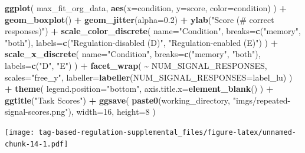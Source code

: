 \documentclass[
]{book}
\newenvironment{Shaded}{\begin{snugshade}}{\end{snugshade}}
\newcommand{\DataTypeTok}[1]{\textcolor[rgb]{0.13,0.29,0.53}{#1}}
\newcommand{\DecValTok}[1]{\textcolor[rgb]{0.00,0.00,0.81}{#1}}
\newcommand{\FloatTok}[1]{\textcolor[rgb]{0.00,0.00,0.81}{#1}}
\newcommand{\KeywordTok}[1]{\textcolor[rgb]{0.13,0.29,0.53}{\textbf{#1}}}
\newcommand{\NormalTok}[1]{#1}
\newcommand{\OperatorTok}[1]{\textcolor[rgb]{0.81,0.36,0.00}{\textbf{#1}}}
\newcommand{\StringTok}[1]{\textcolor[rgb]{0.31,0.60,0.02}{#1}}
\begin{document}
\begin{Shaded}
\begin{Highlighting}[]
\KeywordTok{ggplot}\NormalTok{( max\_fit\_org\_data, }\KeywordTok{aes}\NormalTok{(}\DataTypeTok{x=}\NormalTok{condition, }\DataTypeTok{y=}\NormalTok{score, }\DataTypeTok{color=}\NormalTok{condition) ) }\OperatorTok{+}
\StringTok{  }\KeywordTok{geom\_boxplot}\NormalTok{() }\OperatorTok{+}
\StringTok{  }\KeywordTok{geom\_jitter}\NormalTok{(}\DataTypeTok{alpha=}\FloatTok{0.2}\NormalTok{) }\OperatorTok{+}
\StringTok{  }\KeywordTok{ylab}\NormalTok{(}\StringTok{"Score (\# correct responses)"}\NormalTok{) }\OperatorTok{+}
\StringTok{  }\KeywordTok{scale\_color\_discrete}\NormalTok{(}
    \DataTypeTok{name=}\StringTok{"Condition"}\NormalTok{,}
    \DataTypeTok{breaks=}\KeywordTok{c}\NormalTok{(}\StringTok{"memory"}\NormalTok{, }\StringTok{"both"}\NormalTok{),}
    \DataTypeTok{labels=}\KeywordTok{c}\NormalTok{(}\StringTok{"Regulation{-}disabled (D)"}\NormalTok{, }\StringTok{"Regulation{-}enabled (E)"}\NormalTok{)}
\NormalTok{  ) }\OperatorTok{+}
\StringTok{  }\KeywordTok{scale\_x\_discrete}\NormalTok{(}
    \DataTypeTok{name=}\StringTok{"Condition"}\NormalTok{,}
    \DataTypeTok{breaks=}\KeywordTok{c}\NormalTok{(}\StringTok{"memory"}\NormalTok{, }\StringTok{"both"}\NormalTok{),}
    \DataTypeTok{labels=}\KeywordTok{c}\NormalTok{(}\StringTok{"D"}\NormalTok{, }\StringTok{"E"}\NormalTok{)}
\NormalTok{  ) }\OperatorTok{+}
\StringTok{  }\KeywordTok{facet\_wrap}\NormalTok{(}
    \OperatorTok{\textasciitilde{}}\StringTok{ }\NormalTok{NUM\_SIGNAL\_RESPONSES,}
    \DataTypeTok{scales=}\StringTok{"free\_y"}\NormalTok{,}
    \DataTypeTok{labeller=}\KeywordTok{labeller}\NormalTok{(}\DataTypeTok{NUM\_SIGNAL\_RESPONSES=}\NormalTok{label\_lu)}
\NormalTok{  ) }\OperatorTok{+}
\StringTok{  }\KeywordTok{theme}\NormalTok{(}
    \DataTypeTok{legend.position=}\StringTok{"bottom"}\NormalTok{,}
    \DataTypeTok{axis.title.x=}\KeywordTok{element\_blank}\NormalTok{()}
\NormalTok{  ) }\OperatorTok{+}
\StringTok{  }\KeywordTok{ggtitle}\NormalTok{(}\StringTok{"Task Scores"}\NormalTok{) }\OperatorTok{+}
\StringTok{  }\KeywordTok{ggsave}\NormalTok{(}
    \KeywordTok{paste0}\NormalTok{(working\_directory, }\StringTok{"imgs/repeated{-}signal{-}scores.png"}\NormalTok{),}
    \DataTypeTok{width=}\DecValTok{16}\NormalTok{,}
    \DataTypeTok{height=}\DecValTok{8}
\NormalTok{  )}
\end{Highlighting}
\end{Shaded}

\texttt{[image: tag-based-regulation-supplemental\_files/figure-latex/unnamed-chunk-14-1.pdf]}
\end{document}
